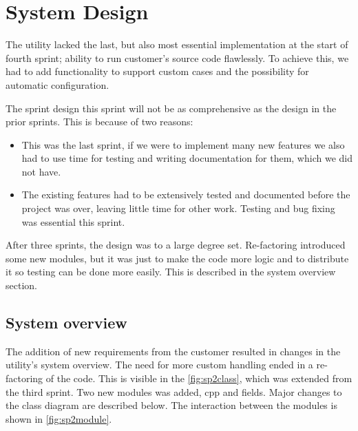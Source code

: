 \section{System Design}
\label{sec:sp4design}
The utility lacked the last, but also most essential implementation at the start of fourth sprint; ability to run customer's source code flawlessly. To achieve this, we had to add functionality to support custom cases and the possibility for automatic configuration.

The sprint design this sprint will not be as comprehensive as the design in the prior sprints. This is because of two reasons:
\begin{itemize}
	\item This was the last sprint, if we were to implement many new features we also had to use time for testing and writing documentation for them, which we did not have.
	\item The existing features had to be extensively tested and documented before the project was over, leaving little time for other work. Testing and bug fixing was essential this sprint.
\end{itemize}
After three sprints, the design was to a large degree set. Re-factoring introduced some new modules, but it was just to make the code more logic and to distribute it so testing can be done more easily. This is described in the system overview section.

\subsection{System overview}
The addition of new requirements from the customer resulted in changes in the utility's system overview. The need for more custom handling ended in a re-factoring of the code. This is visible in the \autoref{fig:sp2class}, which was extended from the third sprint. Two new modules was added, cpp and fields. Major changes to the class diagram are described below. The interaction between the modules is shown in \autoref{fig:sp2module}.

